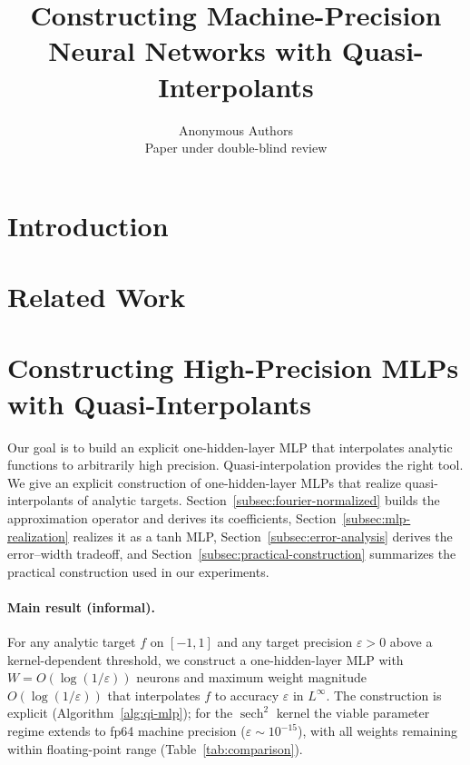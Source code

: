 \documentclass{article}
\title{Constructing Machine-Precision Neural Networks with Quasi-Interpolants}
\author{%
  Anonymous Authors \\
  Paper under double-blind review
}
\begin{document}
\maketitle

\begin{abstract}
\end{abstract}

\section{Introduction}

\section{Related Work}


\section{Constructing High-Precision MLPs with Quasi-Interpolants}
\label{sec:qi-construction}

Our goal is to build an explicit one-hidden-layer MLP that interpolates analytic functions to arbitrarily high precision. Quasi-interpolation provides the right tool. We give an explicit construction of one-hidden-layer MLPs that realize quasi-interpolants of analytic targets. Section~\ref{subsec:fourier-normalized} builds the approximation operator and derives its coefficients, Section~\ref{subsec:mlp-realization} realizes it as a tanh MLP, Section~\ref{subsec:error-analysis} derives the error--width tradeoff, and Section~\ref{subsec:practical-construction} summarizes the practical construction used in our experiments.

\paragraph{Main result (informal).}
For any analytic target \(f\) on \([-1,1]\) and any target precision \(\varepsilon>0\) above a kernel-dependent threshold, we construct a one-hidden-layer MLP with \(W = O(\log(1/\varepsilon))\) neurons and maximum weight magnitude \(O(\log(1/\varepsilon))\) that interpolates \(f\) to accuracy \(\varepsilon\) in \(L^\infty\).  The construction is explicit (Algorithm~\ref{alg:qi-mlp}); for the \(\operatorname{sech}^2\) kernel the viable parameter regime extends to fp64 machine precision (\(\varepsilon\sim 10^{-15}\)), with all weights remaining within floating-point range (Table~\ref{tab:comparison}).
\end{document}
